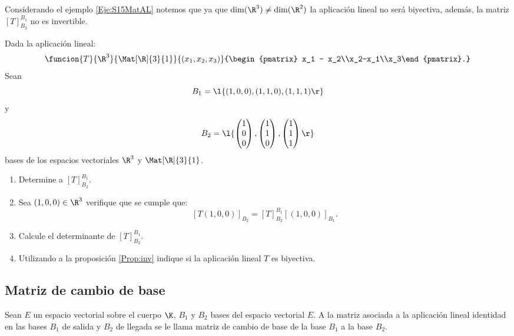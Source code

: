 \documentclass[compacto,10pt]{pubciencias-notas}
\begin{document}
\begin{ejem}\hspace{0pt} Considerando el ejemplo \ref{Eje:S15MatAL} notemos que ya que $\dim(\R^{3}) \neq \dim(\R^{2})$ la aplicación lineal no será biyectiva, además, la matriz $[T]^{B_{1}}_{B_{2}}$ no es invertible.
\end{ejem}

\begin{ejer}\hspace{0pt} Dada la aplicación lineal:
\[
    \funcion{T}{\R^3}{\Mat[\R]{3}{1}}{(x_1,x_2,x_3)}{\begin{pmatrix}
        x_1 - x_2\\x_2-x_1\\x_3\end{pmatrix}.}
\]
Sean 
\[
    B_{1} = \l\{(1,0,0), (1,1,0), (1,1,1)\r\}
\]
y 
\[
    B_{2} = \l\{\begin{pmatrix}1\\0\\0\end{pmatrix},\begin{pmatrix}1\\1\\0\end{pmatrix},\begin{pmatrix}1\\1\\1\end{pmatrix}\r\}
\]
bases de los espacios vectoriales $\R^{3}$ y $\Mat[\R]{3}{1}$.
\begin{enumerate}
    \item Determine a $[T]^{B_{1}}_{B_{2}}$.
    \item Sea $(1,0,0)\in\R^3$ verifique que se cumple que:
    \[
        [T(1,0,0)]_{B_{2}} = [T]^{B_{1}}_{B_{2}} [(1,0,0)]_{B_{1}}.
    \]
    \item Calcule el determinante de $[T]^{B_{1}}_{B_{2}}$.
    \item Utilizando a la proposición \ref{Prop:inv} indique si la aplicación lineal $T$ es biyectiva.
\end{enumerate}
\end{ejer}
\subsection{Matriz de cambio de base}

\begin{defi}
    Sean $E$ un espacio vectorial sobre el cuerpo $\K$, $B_{1}$ y $B_{2}$ bases del espacio vectorial $E$. A la matriz asociada a la aplicación lineal identidad en las bases $B_{1}$ de salida y $B_{2}$ de llegada se le llama matriz de cambio de base de la base $B_{1}$ a la base $B_{2}$.
\end{defi}
\end{document}
